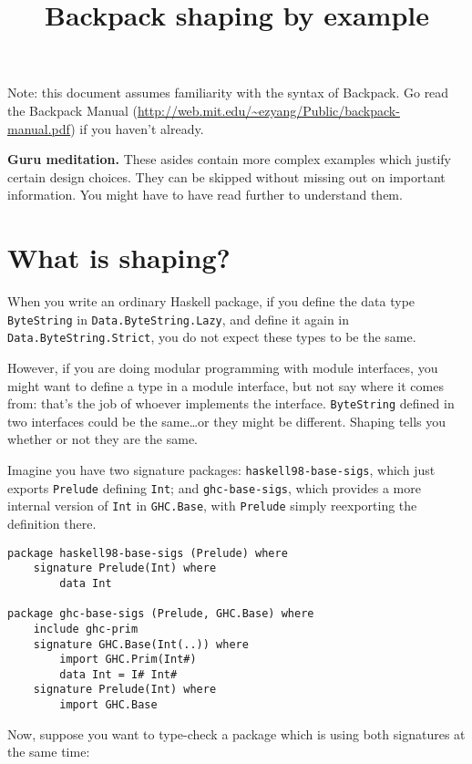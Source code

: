 \documentclass{article}
\title{Backpack shaping by example}
\newenvironment{aside}
  {\begin{mdframed}[style=0,%
      leftline=false,rightline=false,leftmargin=2em,rightmargin=2em,%
          innerleftmargin=0pt,innerrightmargin=0pt,linewidth=0.75pt,%
      skipabove=7pt,skipbelow=7pt]\small}
  {\end{mdframed}}
\begin{document}
\maketitle

Note: this document assumes familiarity with the syntax of Backpack. Go
read the Backpack Manual (\url{http://web.mit.edu/~ezyang/Public/backpack-manual.pdf}) if you haven't already.

\begin{aside}
\textbf{Guru meditation.} These asides contain more complex examples
which justify certain design choices. They can be skipped without missing
out on important information.  You might have to have read further to
understand them.
\end{aside}

\section{What is shaping?}

When you write an ordinary Haskell package, if you define
the data type \verb|ByteString| in \verb|Data.ByteString.Lazy|,
and define it again in \verb|Data.ByteString.Strict|, you
do not expect these types to be the same.

However, if you are doing modular programming with module interfaces, you
might want to define a type in a module interface, but not say where
it comes from: that's the job of whoever implements the
interface.  \verb|ByteString| defined in two interfaces could be
the same\ldots or they might be different.  Shaping tells you whether
or not they are the same.

Imagine you have two signature packages: \verb|haskell98-base-sigs|,
which just exports \verb|Prelude| defining \verb|Int|; and \verb|ghc-base-sigs|,
which provides a more internal version of \verb|Int| in \verb|GHC.Base|, with
\verb|Prelude| simply reexporting the definition there.

\begin{verbatim}
package haskell98-base-sigs (Prelude) where
    signature Prelude(Int) where
        data Int

package ghc-base-sigs (Prelude, GHC.Base) where
    include ghc-prim
    signature GHC.Base(Int(..)) where
        import GHC.Prim(Int#)
        data Int = I# Int#
    signature Prelude(Int) where
        import GHC.Base
\end{verbatim}

Now, suppose you want to type-check a package which is using both
signatures at the same time:
\end{document}
